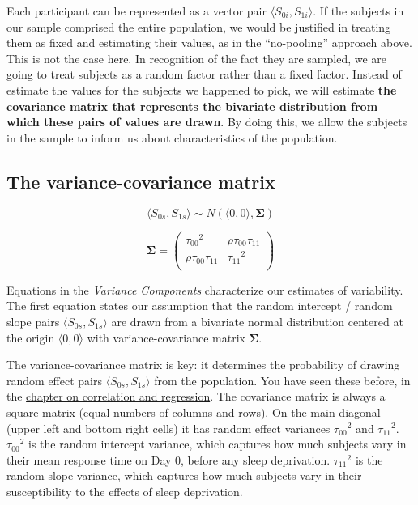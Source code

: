 \documentclass[]{book}
\begin{document}
Each participant can be represented as a vector pair \(\langle S_{0i}, S_{1i} \rangle\). If the subjects in our sample comprised the entire population, we would be justified in treating them as fixed and estimating their values, as in the ``no-pooling'' approach above. This is not the case here. In recognition of the fact they are sampled, we are going to treat subjects as a random factor rather than a fixed factor. Instead of estimate the values for the subjects we happened to pick, we will estimate \textbf{the covariance matrix that represents the bivariate distribution from which these pairs of values are drawn}. By doing this, we allow the subjects in the sample to inform us about characteristics of the population.

\hypertarget{the-variance-covariance-matrix}{%
\subsection{The variance-covariance matrix}\label{the-variance-covariance-matrix}}

\begin{equation}
 \langle S_{0s}, S_{1s} \rangle \sim N\left(\langle 0, 0 \rangle, \mathbf{\Sigma}\right) 
\end{equation}

\begin{equation}
\mathbf{\Sigma} = \left(\begin{array}{cc}{\tau_{00}}^2 & \rho\tau_{00}\tau_{11} \\
         \rho\tau_{00}\tau_{11} & {\tau_{11}}^2 \\
         \end{array}\right) 
\end{equation}

Equations in the \emph{Variance Components} characterize our estimates of variability. The first equation states our assumption that the random intercept / random slope pairs \(\langle S_{0s}, S_{1s} \rangle\) are drawn from a bivariate normal distribution centered at the origin \(\langle 0, 0 \rangle\) with variance-covariance matrix \(\mathbf{\Sigma}\).

The variance-covariance matrix is key: it determines the probability of drawing random effect pairs \(\langle S_{0s}, S_{1s} \rangle\) from the population. You have seen these before, in the \href{03-bivariate-simulation.html}{chapter on correlation and regression}. The covariance matrix is always a square matrix (equal numbers of columns and rows). On the main diagonal (upper left and bottom right cells) it has random effect variances \({\tau_{00}}^2\) and \({\tau_{11}}^2\). \({\tau_{00}}^2\) is the random intercept variance, which captures how much subjects vary in their mean response time on Day 0, before any sleep deprivation. \({\tau_{11}}^2\) is the random slope variance, which captures how much subjects vary in their susceptibility to the effects of sleep deprivation.
\end{document}
